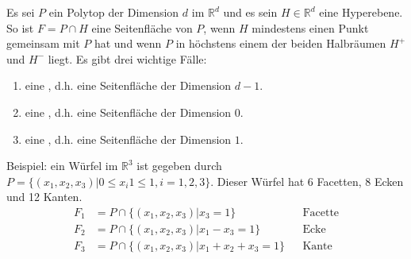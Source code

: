 Es sei $P$ ein Polytop der Dimension $d$ im $\mathbb R^d$ und es sein $H \in \mathbb R^d$ eine Hyperebene. So ist $F = P \cap H$ eine Seitenfläche von $P$, wenn $H$ mindestens einen Punkt gemeinsam mit $P$ hat und wenn $P$ in höchstens einem der beiden Halbräumen $H^{+}$ und $H^{-}$ liegt. Es gibt drei wichtige Fälle:
\begin{enumerate}
\item eine , d.h. eine Seitenfläche der Dimension $d-1$.
\item eine , d.h. eine Seitenfläche der Dimension $0$.
\item eine , d.h. eine Seitenfläche der Dimension $1$.
\end{enumerate}
Beispiel: ein Würfel im $\mathbb R^3$ ist gegeben durch $P = \{(x_1,x_2,x_3) | 0 \leq x_i1 \leq 1, i=1,2,3\}$. Dieser Würfel hat 6 Facetten, 8 Ecken und 12 Kanten.
\begin{align*}
F_1 &= P \cap \{(x_1,x_2,x_3) | x_3 = 1 \} && \text{Facette} \\
F_2 &= P \cap \{(x_1,x_2,x_3) | x_1 - x_3 = 1 \} && \text{Ecke} \\
F_3 &= P \cap \{(x_1,x_2,x_3) | x_1 + x_2 + x_3 = 1 \} && \text{Kante}
\end{align*}

